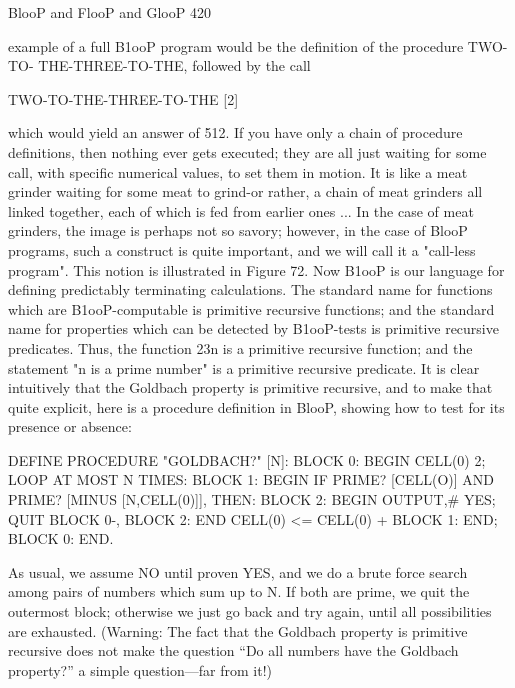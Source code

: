 BlooP and FlooP and GlooP                                                               420

example of a full B1ooP program would be the definition of the procedure TWO-TO-
THE-THREE-TO-THE, followed by the call

                         TWO-TO-THE-THREE-TO-THE [2]

which would yield an answer of 512.
         If you have only a chain of procedure definitions, then nothing ever gets executed;
they are all just waiting for some call, with specific numerical values, to set them in
motion. It is like a meat grinder waiting for some meat to grind-or rather, a chain of meat
grinders all linked together, each of which is fed from earlier ones ... In the case of meat
grinders, the image is perhaps not so savory; however, in the case of BlooP programs,
such a construct is quite important, and we will call it a "call-less program". This notion
is illustrated in Figure 72.
         Now B1ooP is our language for defining predictably terminating calculations. The
standard name for functions which are B1ooP-computable is primitive recursive
functions; and the standard name for properties which can be detected by B1ooP-tests is
primitive recursive predicates. Thus, the function 23n is a primitive recursive function;
and the statement "n is a prime number" is a primitive recursive predicate.
         It is clear intuitively that the Goldbach property is primitive recursive, and to
make that quite explicit, here is a procedure definition in BlooP, showing how to test for
its presence or absence:

DEFINE PROCEDURE "GOLDBACH?" [N]:
BLOCK 0: BEGIN
           CELL(0)    2;
           LOOP AT MOST N TIMES:
           BLOCK 1: BEGIN
                      IF {PRIME? [CELL(O)]
                         AND PRIME? [MINUS [N,CELL(0)]]},
                            THEN:
                            BLOCK 2: BEGIN
                                  OUTPUT,\# YES;
                                  QUIT BLOCK 0-,
                            BLOCK 2: END
                            CELL(0) <= CELL(0) +
           BLOCK 1: END;
BLOCK 0: END.


As usual, we assume NO until proven YES, and we do a brute force search among pairs
of numbers which sum up to N. If both are prime, we quit the outermost block; otherwise
we just go back and try again, until all possibilities are exhausted.
(Warning: The fact that the Goldbach property is primitive recursive does not make the
question “Do all numbers have the Goldbach property?” a simple question—far from it!)




